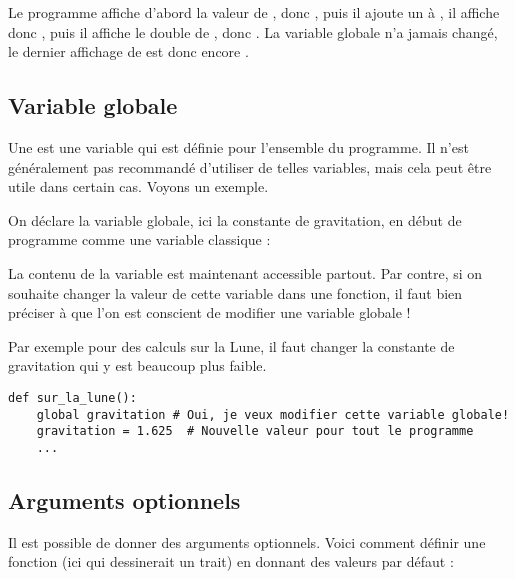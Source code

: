 \documentclass[11pt,class=report,crop=false]{standalone}
\begin{document}

Le programme affiche d'abord la valeur de , donc , puis il ajoute un à , il affiche donc , puis il affiche le double de , donc . La variable globale  n'a jamais changé, le dernier affichage de  est donc encore .

\subsection{Variable globale}

Une  est une variable qui est définie pour l'ensemble du programme. Il n'est généralement pas recommandé d'utiliser de telles variables, mais cela peut être utile dans certain cas. Voyons un exemple.

On déclare la variable globale, ici la constante de gravitation, en début de programme comme une variable classique : 

\centerline{}

La contenu de la variable  est maintenant accessible partout.
Par contre, si on souhaite changer la valeur de cette variable dans une fonction, il faut bien préciser à \Python{} que l'on est conscient de modifier une variable globale !

Par exemple pour des calculs sur la Lune, il faut changer la constante de gravitation qui y est beaucoup plus faible.

\begin{lstlisting}
def sur_la_lune():
    global gravitation # Oui, je veux modifier cette variable globale!
    gravitation = 1.625  # Nouvelle valeur pour tout le programme    
    ...
\end{lstlisting}


\subsection{Arguments optionnels}


Il est possible de donner des arguments optionnels. Voici comment définir une fonction (ici qui dessinerait un trait) en donnant des valeurs par défaut :\\
 \centerline{}
 
\end{document}
